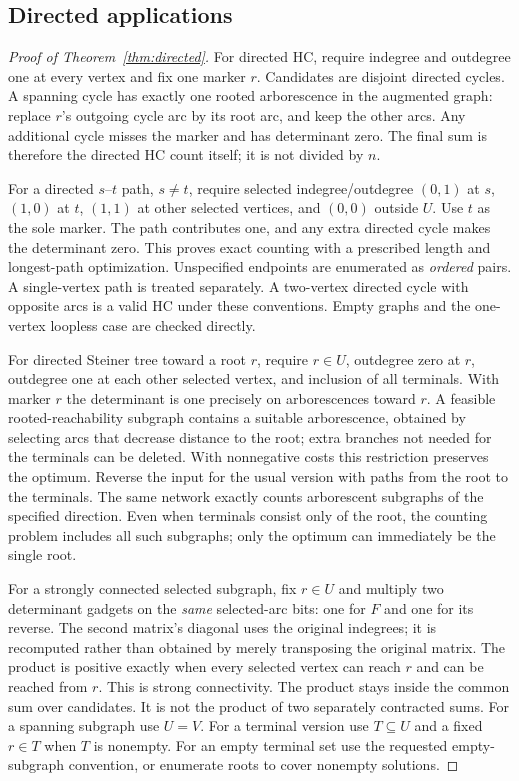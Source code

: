 \subsection{Directed applications}

\begin{proof}[Proof of Theorem~\ref{thm:directed}]
For directed HC, require indegree and outdegree one at every vertex
and fix one marker $r$. Candidates are disjoint directed cycles.
A spanning cycle has exactly one rooted arborescence in the augmented
graph: replace $r$'s outgoing cycle arc by its root arc, and keep the
other arcs. Any additional cycle misses the marker and has determinant
zero. The final sum is therefore the directed HC count itself; it
is not divided by $n$.

For a directed $s$--$t$ path, $s\ne t$, require selected indegree/outdegree
$(0,1)$ at $s$, $(1,0)$ at $t$, $(1,1)$ at other selected vertices,
and $(0,0)$ outside $U$. Use $t$ as the sole marker. The path contributes
one, and any extra directed cycle makes the determinant zero. This
proves exact counting with a prescribed length and longest-path
optimization. Unspecified endpoints are enumerated as \emph{ordered}
pairs. A single-vertex path is treated separately. A two-vertex directed
cycle with opposite arcs is a valid HC under these conventions.
Empty graphs and the one-vertex loopless case are checked directly.

For directed Steiner tree toward a root $r$, require $r\in U$,
outdegree zero at $r$, outdegree one at each other selected vertex,
and inclusion of all terminals. With marker $r$ the determinant is
one precisely on arborescences toward $r$. A feasible rooted-reachability
subgraph contains a suitable arborescence, obtained by selecting arcs
that decrease distance to the root; extra branches not needed for the
terminals can be deleted. With nonnegative costs this restriction
preserves the optimum. Reverse the input for the usual version with
paths from the root to the terminals. The same network exactly counts
arborescent subgraphs of the specified direction. Even when terminals
consist only of the root, the counting problem includes all such
subgraphs; only the optimum can immediately be the single root.

For a strongly connected selected subgraph, fix $r\in U$ and multiply
two determinant gadgets on the \emph{same} selected-arc bits: one for
$F$ and one for its reverse. The second matrix's diagonal uses the
original indegrees; it is recomputed rather than obtained by merely
transposing the original matrix. The product is positive exactly when
every selected vertex can reach $r$ and can be reached from $r$.
This is strong connectivity. The product stays inside the common
sum over candidates. It is not the product of two separately
contracted sums. For a spanning subgraph use $U=V$. For a terminal
version use $T\subseteq U$ and a fixed $r\in T$ when $T$ is nonempty.
For an empty terminal set use the requested empty-subgraph convention,
or enumerate roots to cover nonempty solutions.


\end{proof}
